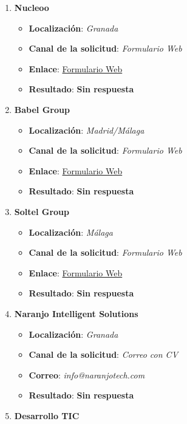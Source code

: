 \begin{enumerate}
	\item \textbf{Nucleoo}
	\begin{itemize}
		\item \textbf{Localización}: \textit{Granada}
		\item \textbf{Canal de la solicitud}: \textit{Formulario Web}
		\item \textbf{Enlace}: \href{https://nucleoo.factorialhr.es/apply}{Formulario Web}
		\item \textbf{Resultado}: {\color{orange} \textbf{Sin respuesta}}
	\end{itemize}
	 \item \textbf{Babel Group}
	\begin{itemize}
		\item \textbf{Localización}: \textit{Madrid/Málaga}
		\item \textbf{Canal de la solicitud}: \textit{Formulario Web}
		\item \textbf{Enlace}: \href{https://babelgroup.wd103.myworkdayjobs.com/es/REC_External_Career_Site/job/Prcticas-FPGS---Software-Engineer--Infrastructure-Technician_JR102635}{Formulario Web}
		\item \textbf{Resultado}: {\color{orange} \textbf{Sin respuesta}}
	\end{itemize}
	 \item \textbf{Soltel Group}
	\begin{itemize}
		\item \textbf{Localización}: \textit{Málaga}
		\item \textbf{Canal de la solicitud}: \textit{Formulario Web}
		\item \textbf{Enlace}: \href{https://www.soltel.es/unete-a-nosotros/}{Formulario Web}
		\item \textbf{Resultado}: {\color{orange} \textbf{Sin respuesta}}
	\end{itemize}
    \item \textbf{Naranjo Intelligent Solutions}
	\begin{itemize}
		\item \textbf{Localización}: \textit{Granada}
		\item \textbf{Canal de la solicitud}: \textit{Correo con CV}
		\item \textbf{Correo}: \textit{info@naranjotech.com}
		\item \textbf{Resultado}: {\color{orange} \textbf{Sin respuesta}}
	\end{itemize}
	\item \textbf{Desarrollo TIC}
	\begin{itemize}

\end{itemize}
\end{enumerate}
